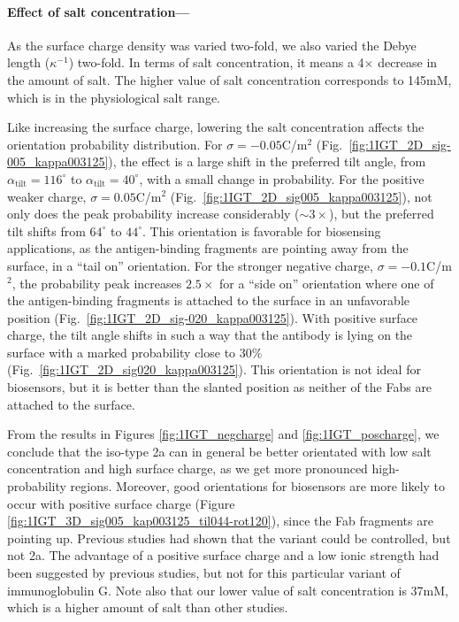  \medskip
 
 \paragraph*{Effect of salt concentration---}
 
As the surface charge density was varied two-fold, we also varied the Debye length ($\kappa^{-1}$) two-fold. In terms of salt concentration, it means a 4$\times$ decrease in the amount of salt. The higher value of salt concentration corresponds to 145mM, which is in the physiological salt range.  
 
Like increasing the surface charge, lowering the salt concentration affects the orientation probability distribution. 
 For $\sigma=-0.05$C/m$^2$ (Fig.~\ref{fig:1IGT_2D_sig-005_kappa003125}), the effect is a large shift in the preferred tilt angle, from $\alpha_\text{tilt}=116^\circ$ to $\alpha_\text{tilt}=40^\circ$, with a small change in probability. 
For the positive weaker charge, $\sigma=0.05$C/m$^2$ (Fig.~\ref{fig:1IGT_2D_sig005_kappa003125}), not only does the peak probability increase considerably ($\sim 3\times$), but the preferred tilt shifts from $64^{\circ}$ to $44^{\circ}$.
This orientation is favorable for biosensing applications, as the antigen-binding fragments are pointing away from the surface, in a ``tail on'' orientation.
 For the stronger negative charge, $\sigma=-0.1$C/m$^2$, the probability peak increases  $2.5\times$ for a ``side on'' orientation where one of the antigen-binding fragments is attached to the surface in an unfavorable position (Fig.~\ref{fig:1IGT_2D_sig-020_kappa003125}).
 With positive surface charge, the tilt angle shifts in such a way that the antibody is lying on the surface with a marked probability close to $30\%$ (Fig.~\ref{fig:1IGT_2D_sig020_kappa003125}).
 This orientation is not ideal for biosensors, but it is better than the slanted position as neither of the Fabs are attached to the surface.

From the results in Figures \ref{fig:1IGT_negcharge} and \ref{fig:1IGT_poscharge}, we conclude that the iso-type \ig 2a can in general be better orientated with low salt concentration and high surface charge, as we get more pronounced high-probability regions. 
Moreover, good orientations for biosensors are more likely to occur with positive surface charge (Figure \ref{fig:1IGT_3D_sig005_kap003125_til044-rot120}), since the Fab fragments are pointing up.
Previous studies had shown that the  variant could be controlled, but not \ig 2a. 
The advantage of a positive surface charge and a low ionic strength had been suggested by previous studies, but not for this particular variant of immunoglobulin G. Note also that our lower value of salt concentration is 37mM, which is a higher amount of salt than other studies.\cite{BuijsETal1997,ChenLiuZhouJiang2003}


